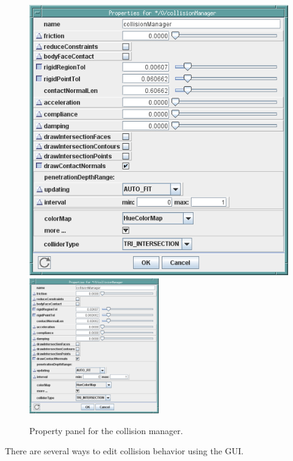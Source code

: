 \documentclass{article}
\begin{document}
\begin{figure}[h]
\begin{center}
\iflatexml
\includegraphics[]{images/collisionProperties}
\else
\includegraphics[width=0.50\textwidth]{images/collisionProperties}
\fi
\end{center}
\caption{Property panel for the collision manager.}
\label{collisionProperties:fig}
\end{figure}

There are several ways to edit collision behavior using the GUI.
\end{document}
